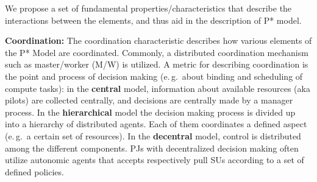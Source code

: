 \documentclass[conference,final]{IEEEtran}
\newcommand{\jhanote}[1]{ {\textcolor{red} { ***shantenu: #1 }}}
\newcommand{\alnote}[1]{ {\textcolor{blue} { ***andre: #1 }}}
\newcommand{\alnote}[1]{}
\newcommand{\jhanote}[1]{}
\begin{document}

We propose a set of fundamental properties/characteristics that
describe the interactions between the elements, and thus aid in the
description of P* model.



\textbf{Coordination:} The coordination characteristic describes how
various elements of the P* Model are coordinated.
Commonly, a distributed coordination mechanism such as master/worker
(M/W) is utilized. A metric for describing coordination is the point and
process of decision making (e.\,g.\ about binding and
scheduling of compute tasks): in the \textbf{central} model,
information about available resources (aka pilots) are collected
centrally, and decisions are centrally made by a manager
process. %
In the \textbf{hierarchical} model the decision making process is
divided up into a hierarchy of distributed agents. Each of them
coordinates a defined aspect (e.\,g.\ a certain set of resources). In
the \textbf{decentral} model, control is distributed among the
different components.  PJs with decentralized decision making often
utilize autonomic agents that accepts respectively pull SUs according
to a set of defined policies.



% 
\end{document}
